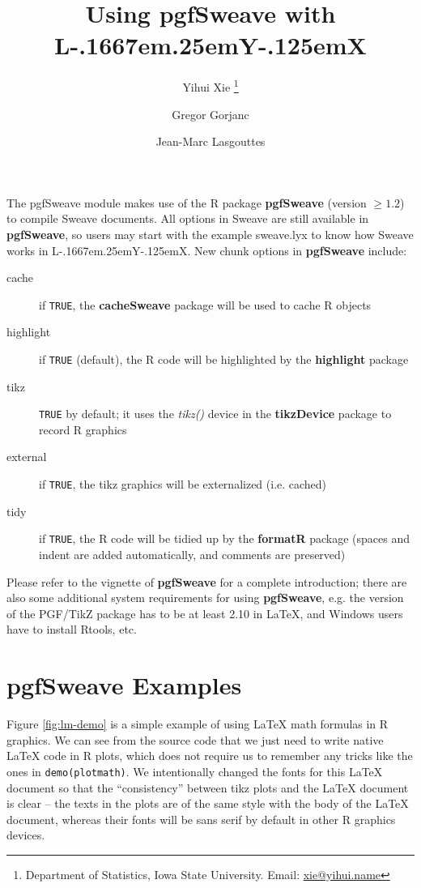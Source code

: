 \documentclass[english,noae,nogin]{article}
\makeatletter
\providecommand{\LyX}{\texorpdfstring%
  {L\kern-.1667em\lower.25em\hbox{Y}\kern-.125emX\@}
  {LyX}}
\def\maxwidth{%
\ifdim\Gin@nat@width>\linewidth
\linewidth
\else
\Gin@nat@width
\fi
}
\makeatother
\begin{document}
\setkeys{Gin}{width=\maxwidth}




\title{Using pgfSweave with \LyX{}}


\author{Yihui Xie%
\thanks{Department of Statistics, Iowa State University. Email: \protect\href{mailto:xie@yihui.name}{xie@yihui.name}%
} \and Gregor Gorjanc \and Jean-Marc Lasgouttes}

\maketitle
The \textsf{pgfSweave} module makes use of the R package \textbf{pgfSweave}
(version $\geq1.2$) to compile Sweave documents. All options in Sweave
are still available in \textbf{pgfSweave}, so users may start with
the example \textsf{sweave.lyx} to know how Sweave works in \LyX{}.
New chunk options in \textbf{pgfSweave} include:
\begin{description}
\item [{cache}] if \texttt{TRUE}, the \textbf{cacheSweave} package will
be used to cache R objects
\item [{highlight}] if \texttt{TRUE} (default), the R code will be highlighted
by the \textbf{highlight} package
\item [{tikz}] \texttt{TRUE} by default; it uses the \emph{tikz()} device
in the \textbf{tikzDevice} package to record R graphics
\item [{external}] if \texttt{TRUE}, the tikz graphics will be externalized
(i.e. cached)
\item [{tidy}] if \texttt{TRUE}, the R code will be tidied up by the \textbf{formatR}
package (spaces and indent are added automatically, and comments are
preserved)
\end{description}
Please refer to the vignette of \textbf{pgfSweave} for a complete
introduction; there are also some additional system requirements for
using \textbf{pgfSweave}, e.g. the version of the PGF/TikZ package
has to be at least 2.10 in \LaTeX{}, and Windows users have to install
Rtools, etc.


\section{pgfSweave Examples}

Figure \ref{fig:lm-demo} is a simple example of using \LaTeX{} math
formulas in R graphics. We can see from the source code that we just
need to write native \LaTeX{} code in R plots, which does not require
us to remember any tricks like the ones in \texttt{demo(plotmath)}.
We intentionally changed the fonts for this \LaTeX{} document so that
the ``consistency'' between tikz plots and the \LaTeX{} document
is clear -- the texts in the plots are of the same style with the
body of the \LaTeX{} document, whereas their fonts will be \textsf{sans
serif} by default in other R graphics devices.
\end{document}
